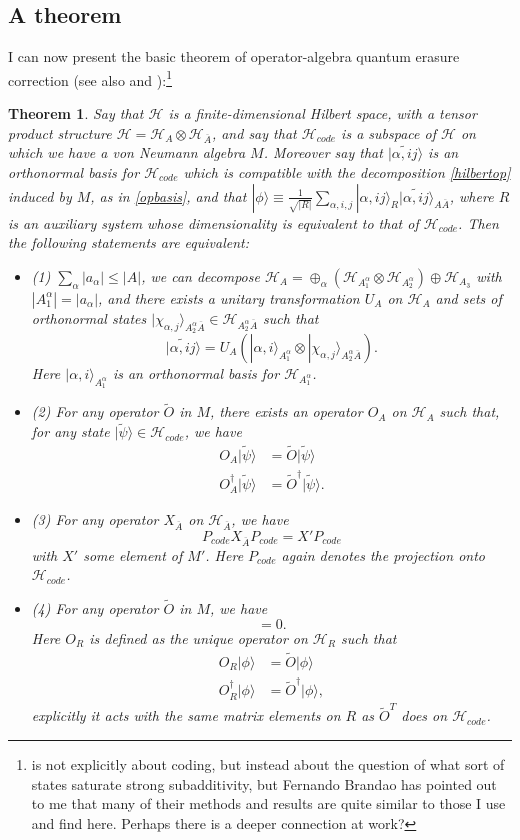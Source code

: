 \documentclass[12pt]{article}
\newcommand{\be}{\begin{equation}}
\newcommand{\ee}{\end{equation}}
\newcommand{\bi}{\begin{itemize}}
\newcommand{\ei}{\end{itemize}}
\newcommand{\ran}{\rangle}
\newcommand{\wt}{\widetilde}
\newcommand{\Hh}{\mathcal{H}}
\newcommand{\HA}{\mathcal{H}_A}
\newcommand{\HAb}{\mathcal{H}_{\ol{A}}}
\newcommand{\Ab}{\ol{A}}
\newcommand{\Hc}{\mathcal{H}_{code}}
\newcommand{\ol}{\overline}
\newcommand{\Pc}{P_{code}}
\newtheorem{thm}{Theorem}[section]
\begin{document}
\subsection{A theorem}
I can now present the basic theorem of operator-algebra quantum erasure correction \cite{beny2007generalization,beny2007quantum} (see also \cite{Almheiri:2014lwa} and \cite{hayden2004structure}):\footnote{\cite{hayden2004structure} is not explicitly about coding, but instead about the question of what sort of states saturate strong subadditivity, but Fernando Brandao has pointed out to me that many of their methods and results are quite similar to those I use and find here.  Perhaps there is a deeper connection at work?}
\begin{thm}\label{othm}
Say that $\Hh$ is a finite-dimensional Hilbert space, with a tensor product structure $\Hh=\HA\otimes\HAb$, and say that $\Hc$ is a subspace of $\Hh$ on which we have a von Neumann algebra $M$.  Moreover say that $|\wt{\alpha, i j}\ran$ is an orthonormal basis for $\Hc$ which is compatible with the decomposition \eqref{hilbertop} induced by $M$, as in \eqref{opbasis}, and that $|\phi\ran\equiv \frac{1}{\sqrt{|R|}} \sum_{\alpha,i,j} |\alpha,ij\ran_R|\wt{\alpha,ij}\ran_{A\ol{A}}$, where $R$ is an auxiliary system whose dimensionality is equivalent to that of $\Hc$. Then the following statements are equivalent:
\bi
\item[(1)] $\sum_\alpha |a_\alpha|\leq |A|$, we can decompose $\HA=\oplus_\alpha\left(\Hh_{A_1^\alpha}\otimes\Hh_{A_2^\alpha}\right)\oplus \Hh_{A_3}$ with $|A_1^\alpha|=|a_\alpha|$, and there exists a unitary transformation $U_A$ on $\HA$ and sets of orthonormal states $|\chi_{\alpha,j}\ran_{A_2^\alpha\ol{A}}\in \Hh_{A_2^\alpha\ol{A}}$ such that
\be
|\wt{\alpha,ij}\ran=U_A\left(|\alpha,i\ran_{A_1^\alpha}\otimes |\chi_{\alpha,j}\ran_{A_2^\alpha\ol{A}}\right).
\ee
Here $|\alpha,i\ran_{A_1^\alpha}$ is an orthonormal basis for $\Hh_{A_1^\alpha}$.

\item[(2)] For any operator $\wt{O}$ in $M$, there exists an operator $O_A$ on $\HA$ such that, for any state $|\wt{\psi}\ran\in \Hc$, we have
\begin{align}\nonumber
O_A|\wt{\psi}\ran&=\wt{O}|\wt{\psi}\ran\\
O_A^\dagger|\wt{\psi}\ran&=\wt{O}^\dagger|\wt{\psi}\ran.
\end{align} 


\item[(3)] For any operator $X_{\ol{A}}$ on $\HAb$, we have
\be
P_{code}X_{\ol{A}}P_{code}=X'\Pc
\ee
with $X'$ some element of $M'$.  Here $P_{code}$ again denotes the projection onto $\Hc$. 
\item[(4)] For any operator $\wt{O}$ in $M$, we have
\be
[O_R,\rho_{R\Ab}(\phi)]=0.
\ee
Here $O_R$ is defined as the unique operator on $\Hh_R$ such that
\begin{align}
O_R|\phi\ran&=\wt{O}|\phi\ran\\
O_R^\dagger|\phi\ran&=\wt{O}^\dagger |\phi\ran,
\end{align}
explicitly it acts with the same matrix elements on $R$ as $\wt{O}^T$ does on $\Hc$.
\ei
\end{thm}
\end{document}
